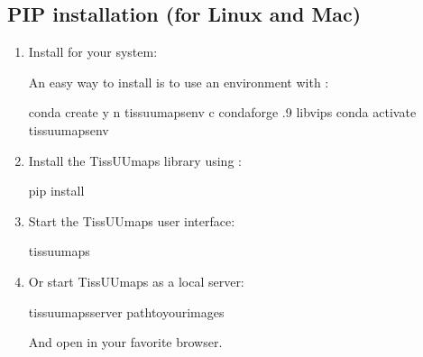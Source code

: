 \documentclass[letterpaper,10pt,english,openany,oneside]{sphinxmanual}
\begin{document}
\subsection{PIP installation (for Linux and Mac)}
\label{\detokenize{docs/intro/installation:pip-installation-for-linux-and-mac}}\begin{enumerate}
%
\item {} 
\sphinxAtStartPar
Install  for your system: 

\sphinxAtStartPar
An easy way to install  is to use an  environment with :

\begin{sphinxVerbatim}[commandchars=\\\{\}]
conda create \PYGZhy{}y \PYGZhy{}n tissuumaps\PYGZus{}env \PYGZhy{}c conda\PYGZhy{}forge .9 libvips
conda activate tissuumaps\PYGZus{}env
\end{sphinxVerbatim}

\item {} 
\sphinxAtStartPar
Install the TissUUmaps library using :

\begin{sphinxVerbatim}[commandchars=\\\{\}]
pip install 
\end{sphinxVerbatim}

\item {} 
\sphinxAtStartPar
Start the TissUUmaps user interface:

\begin{sphinxVerbatim}[commandchars=\\\{\}]
tissuumaps
\end{sphinxVerbatim}

\item {} 
\sphinxAtStartPar
Or start TissUUmaps as a local server:

\begin{sphinxVerbatim}[commandchars=\\\{\}]
tissuumaps\PYGZus{}server path\PYGZus{}to\PYGZus{}your\PYGZus{}images
\end{sphinxVerbatim}

\sphinxAtStartPar
And open  in your favorite browser.

\end{enumerate}
\end{document}

